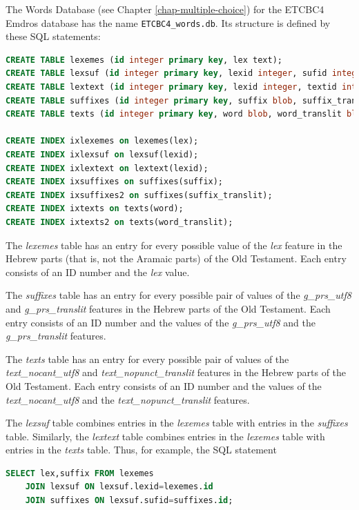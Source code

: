 \documentclass[11pt,oneside,a4paper]{memoir}
\begin{document}
The Words Database (see Chapter \ref{chap-multiple-choice}) for the ETCBC4 Emdros database
has the name \texttt{ETCBC4\_words.db}. Its structure is defined by these SQL statements:

\begin{lstlisting}[language=SQL]
CREATE TABLE lexemes (id integer primary key, lex text);
CREATE TABLE lexsuf (id integer primary key, lexid integer, sufid integer);
CREATE TABLE lextext (id integer primary key, lexid integer, textid integer);
CREATE TABLE suffixes (id integer primary key, suffix blob, suffix_translit blot);
CREATE TABLE texts (id integer primary key, word blob, word_translit blob);

CREATE INDEX ixlexemes on lexemes(lex);
CREATE INDEX ixlexsuf on lexsuf(lexid);
CREATE INDEX ixlextext on lextext(lexid);
CREATE INDEX ixsuffixes on suffixes(suffix);
CREATE INDEX ixsuffixes2 on suffixes(suffix_translit);
CREATE INDEX ixtexts on texts(word);
CREATE INDEX ixtexts2 on texts(word_translit);
\end{lstlisting}

The \emph{lexemes} table has an entry for every possible value of the \emph{lex} feature in the
Hebrew parts (that is, not the Aramaic parts) of the Old Testament. Each entry consists of an ID
number and the \emph{lex} value.

The \emph{suffixes} table has an entry for every possible pair of values of the \emph{g\_prs\_utf8}
and \emph{g\_prs\_translit} features in the Hebrew parts of the Old Testament. Each entry consists
of an ID number and the values of the \emph{g\_prs\_utf8} and the \emph{g\_prs\_translit} features.

The \emph{texts} table has an entry for every possible pair of values of the
\emph{text\_nocant\_utf8} and \emph{text\_nopunct\_translit} features
in the Hebrew parts of the Old Testament. Each entry consists of an ID number and the values of the
\emph{text\_nocant\_utf8} and the \emph{text\_nopunct\_translit} features.

The \emph{lexsuf} table combines entries in the \emph{lexemes} table with entries in the
\emph{suffixes} table. Similarly, the \emph{lextext} table combines entries in the \emph{lexemes}
table with entries in the \emph{texts} table. Thus, for example, the SQL statement

\begin{lstlisting}[language=SQL]
SELECT lex,suffix FROM lexemes
    JOIN lexsuf ON lexsuf.lexid=lexemes.id
    JOIN suffixes ON lexsuf.sufid=suffixes.id;
\end{lstlisting}
\end{document}
